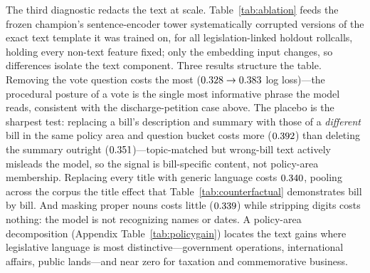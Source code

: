 \documentclass[12pt]{article}
\begin{document}
The third diagnostic redacts the text at scale.
Table~\ref{tab:ablation} feeds the frozen champion's sentence-encoder
tower systematically corrupted versions of the exact text template it
was trained on, for all \ablRC{} legislation-linked holdout rollcalls,
holding every non-text feature fixed; only the embedding input
changes, so differences isolate the text component. Three results
structure the table. Removing the vote question costs the most
($0.328 \rightarrow 0.383$ log loss)---the procedural
posture of a vote is the single most informative phrase the model
reads, consistent with the discharge-petition case above. The placebo
is the sharpest test: replacing a bill's description and summary with
those of a \emph{different} bill in the same policy area and question
bucket costs more ($0.392$) than deleting the summary outright
($0.351$)---topic-matched but wrong-bill text actively misleads
the model, so the signal is bill-specific content, not policy-area
membership. Replacing every title with generic language costs
$0.340$, pooling across the corpus the title effect that
Table~\ref{tab:counterfactual} demonstrates bill by bill. And masking
proper nouns costs little ($0.339$) while stripping digits
costs nothing: the model is not recognizing names or dates. A policy-area decomposition
(Appendix Table~\ref{tab:policygain}) locates the text gains where
legislative language is most distinctive---government operations,
international affairs, public lands---and near zero for taxation and
commemorative business.

\begin{table}[t]
\centering
\caption{Redaction ablations. Each row re-scores the identical
member-vote cells through the frozen model, changing only the text
supplied to its sentence encoder ($N = \ablRC$ legislation-linked
holdout rollcalls). The defection AUC is the noisier statistic (507
rollcalls) and is shown for completeness; log loss is the scoring
rule.}
\label{tab:ablation}
{\small }
\end{table}
\end{document}
